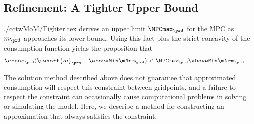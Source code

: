 \documentclass[\econtexRoot/SolvingMicroDSOPs]{subfiles}
\begin{document}
\hypertarget{refinement-a-tighter-upper-bound}{}
\subsection{Refinement: A Tighter Upper Bound}
\begin{verbatimwrite}{./cctwMoM/Tighter.tex}
  \cite{BufferStockTheory} derives an upper limit  $\MPCmax_{\prd}$ for the MPC as $m_{\prd}$
  approaches its lower bound.  Using this
  fact plus the strict concavity of the consumption function yields the
  proposition that
  \begin{equation}\begin{gathered}\begin{aligned}
        \cFunc_{\prd}(\ushort{m}_{\prd}+\aboveMin \mNrm_{\prd}) & < \MPCmax_{\prd} \aboveMin \mNrm_{\prd}.
      \end{aligned}\end{gathered}\end{equation}

  The solution method described above does not guarantee that
  approximated consumption will respect this constraint between gridpoints, and a failure to
  respect the constraint can occasionally cause computational problems in solving
  or simulating the model.  Here, we
  describe a method for constructing an approximation that always
  satisfies the constraint.

  \begin{comment} %
    That is, the realist's consumption function is bounded from above by both
    the \textit{unconstrained} optimist's problem already treated, as well as
    by the \textit{constrained} optimist's problem, which is a 45 degree line
    originating from $\ushort{m}_{\prd}$ on the $m$-axis, as shown in
    Figure~\ref{fig:IntExpFOCInvPesReaOptNeed45Plot}. The same is true for
    the value function, as illustrated in Figure
    \ref{fig:IntExpFOCInvPesReaOptNeed45ValuePlot}.

    \hypertarget{IntExpFOCInvPesReaOptNeed45Plot}{}
    \begin{figure}
      \texttt{[image: ./Figures/IntExpFOCInvPesReaOptNeed45Plot]}
      \caption{45 Degree Line as Another Upper Bound}
      \label{fig:IntExpFOCInvPesReaOptNeed45Plot}
    \end{figure}

    \hypertarget{IntExpFOCInvPesReaOptNeed45ValuePlot}{}
    \begin{figure}
      \texttt{[image: ./Figures/IntExpFOCInvPesReaOptNeed45ValuePlot]}
      \caption{A Constrained Optimist's Value Function as Another Upper Bound}
      \label{fig:IntExpFOCInvPesReaOptNeed45ValuePlot}
    \end{figure}

  \end{comment}

  \newcommand{\mtCusp}{\ensuremath{\mNrm_{\prd}^{\#}}}
\end{verbatimwrite}
\unskip
\end{document}
